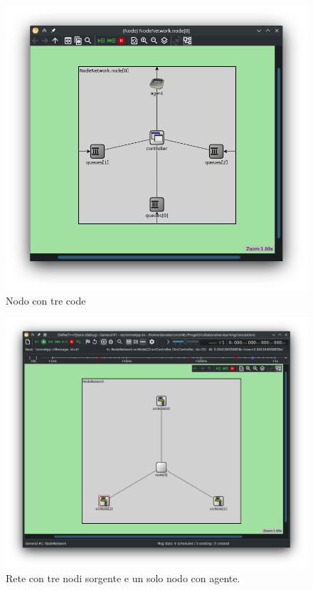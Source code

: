 \documentclass[conference]{IEEEtran}
\begin{document}
\begin{figure}
    \centering
    \includegraphics[width=\textwidth]{figs/node_layout_3queues.png}
    \caption{Nodo con tre code}
    \label{fig:node_layout_3queues}
\end{figure}
\begin{figure}
    \centering
    \includegraphics[width=\textwidth]{figs/network_layout_3queues.png}
    \caption{Rete con tre nodi sorgente e un solo nodo con agente.}
    \label{fig:network_layout_3queues}
\end{figure}
\end{document}

